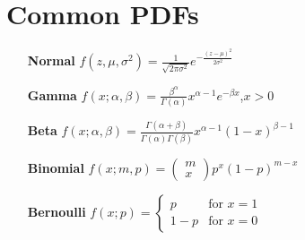 \documentclass[10pt]{article}
\begin{document}
\section{{Common PDFs}}
\begin{itemize}
    \item [\bf Normal] $f(z,\mu,\sigma^2)=\frac{1}{\sqrt{2\pi\sigma^2}}e^{-\frac{{(z-\mu)}^2}{2\sigma^2}}$
    \item [\bf Gamma] $f(x;\alpha,\beta)=\frac{\beta^\alpha}{\Gamma(\alpha)}x^{\alpha-1}e^{-\beta x}$,$x>0$
    \item [\bf Beta] $f(x;\alpha,\beta)=\frac{\Gamma(\alpha+\beta)}{\Gamma(\alpha)\Gamma(\beta)}x^{\alpha-1}{(1-x)}^{\beta-1}$
    \item [\bf Binomial] $f(x;m,p)=\begin{pmatrix}m\\ x\end{pmatrix}p^x(1-p)^{m-x}$
    \item [\bf Bernoulli] $f(x;p)=\begin{cases}
        p & \text{for } x=1\\
        1-p & \text{for } x=0
    \end{cases}$
\end{itemize}

\end{document}

